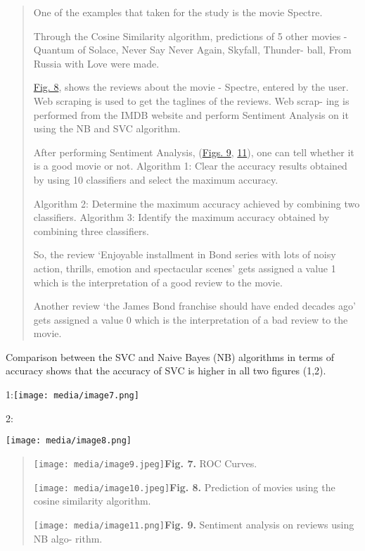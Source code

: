 \documentclass[
]{article}
\begin{document}
\begin{quote}
One of the examples that taken for the study is the movie Spectre.

Through the Cosine Similarity algorithm, predictions of 5 other movies -
Quantum of Solace, Never Say Never Again, Skyfall, Thunder- ball, From
Russia with Love were made.

\protect\hyperlink{_bookmark17}{Fig. 8}, shows the reviews about the
movie - Spectre, entered by the user. Web scraping is used to get the
taglines of the reviews. Web scrap- ing is performed from the IMDB
website and perform Sentiment Analysis on it using the NB and SVC
algorithm.

After performing Sentiment Analysis,
(\protect\hyperlink{_bookmark18}{Figs. 9},
\protect\hyperlink{_bookmark19}{11}), one can tell whether it is a good
movie or not. Algorithm 1: Clear the accuracy results obtained by using
10 classifiers and select the maximum accuracy.

Algorithm 2: Determine the maximum accuracy achieved by combining two
classifiers. Algorithm 3: Identify the maximum accuracy obtained by
combining three classifiers.

So, the review `Enjoyable installment in Bond series with lots of noisy
action, thrills, emotion and spectacular scenes' gets assigned a value 1
which is the interpretation of a good review to the movie.

Another review `the James Bond franchise should have ended decades ago'
gets assigned a value 0 which is the interpretation of a bad review to
the movie.
\end{quote}

Comparison between the SVC and Naive Bayes (NB) algorithms in terms of
accuracy shows that the accuracy of SVC is higher in all two figures
(1,2).

1:\texttt{[image: media/image7.png]}

2:

\texttt{[image: media/image8.png]}

\begin{quote}
\texttt{[image: media/image9.jpeg]}\protect\hypertarget{_bookmark16}{}{}\textbf{Fig.
7.} ROC Curves.

\texttt{[image: media/image10.jpeg]}\protect\hypertarget{_bookmark17}{}{}\textbf{Fig.
8.} Prediction of movies using the cosine similarity algorithm.

\texttt{[image: media/image11.png]}\protect\hypertarget{_bookmark18}{}{}\textbf{Fig.
9.} Sentiment analysis on reviews using NB algo- rithm.
\end{quote}
\end{document}
